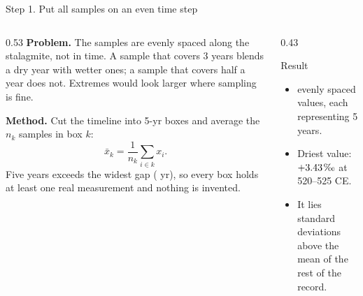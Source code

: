 \documentclass[aspectratio=169,11pt]{beamer}
\newcommand{\permil}{\ensuremath{\text{\textperthousand}}}
\begin{document}
\begin{frame}{Step 1. Put all samples on an even time step}
  \begin{columns}[T]
    \begin{column}{0.53\textwidth}\small
      \textbf{Problem.} The samples are evenly spaced along the
      stalagmite, not in time. A sample that covers 3 years blends a dry
      year with wetter ones; a sample that covers half a year does not.
      Extremes would look larger where sampling is fine.
      \par\medskip
      \textbf{Method.} Cut the timeline into 5-yr boxes and average the
      $n_k$ samples in box $k$:
      \[
        \bar{x}_k = \frac{1}{n_k}\sum_{i \in k} x_i .
      \]
      Five years exceeds the widest gap (\nMaxSpacing{} yr), so every box
      holds at least one real measurement and nothing is invented.
    \end{column}
    \begin{column}{0.43\textwidth}
      \begin{block}{Result}
        \small
        \begin{itemize}\setlength{\itemsep}{2pt}
          \item \nNBins{} evenly spaced values, each representing 5 years.
          \item Driest value: $+3.43$\permil{} at 520--525 CE.
          \item It lies \alert{\nZscore{} standard deviations} above the
                mean of the rest of the record.
        \end{itemize}
      \end{block}
    \end{column}
  \end{columns}
\end{frame}
\end{document}
